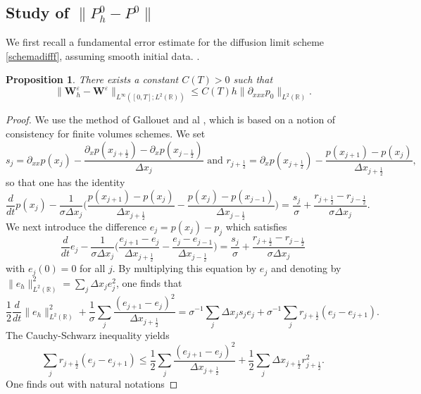 \documentclass[a4paper,french,english,10pt]{article}
\newcommand\eps{\varepsilon}
\newcommand\W{\mathbf{W}}
\newtheorem{proposition}[theorem]{Proposition}
\begin{document}
\subsection{Study of $\| P_h^0 - P^0  \|$}

We  first 
 recall a fundamental   error estimate \cite{FV}
for the diffusion limit scheme \eqref{schemadifff}, assuming smooth initial data.
. 
\begin{proposition}\label{ds1d}
There exists a constant $C(T)>0$ such that
\begin{equation*}
\|\W_h^\eps-\W^\eps\|_{L^{\infty}([0,T];L^2(\mathbb{R}))} \leq
C(T)h \| \partial_{xxx}p_0 \|_{L^2(\mathbb{R})  }.
\end{equation*}
\end{proposition}

\begin{proof}
We  use the method of Gallouet and al \cite{FV}, which
is based on  a notion of consistency for finite volumes schemes.
We set
$$
s_j=\partial_{xx}p(x_j)-\frac{\partial_xp(x_{j+\frac12}  )
-
\partial_xp(x_{j-\frac12}  )
}{\Delta x_j}
\mbox{ and }
r_{j+\frac12}=\partial_{x}p(x_{j+\frac12})-\frac{p(x_{j+1}  )
-
p(x_{j}  )
}{\Delta x_{j+\frac12}},
$$
so that one has the identity
$$
 \frac{d}{dt} p(x_j)
-\frac{1}{\sigma\Delta x_j}\bigg(\frac{p(x_{j+1})-p(x_{j})}{\Delta
x_{j+\frac12 }}-\frac{p(x_{j})-p(x_{j-1})}{\Delta
x_{j-\frac12 }}\bigg)=
\frac{s_j}\sigma+
\frac{r_{j+\frac12}-r_{j-\frac12}}{\sigma \Delta x_j}.
$$
We next  introduce the difference
$e_j=p(x_j)-p_j$ which satisfies
$$
 \frac{d}{dt} e_j
-\frac{1}{\sigma\Delta x_j}\bigg(\frac{e_{j+1}-e_{j}}{\Delta
x_{j+\frac12 }}-\frac{e_{j}-e_{j-1}}{\Delta
x_{j-\frac12 }}\bigg)=
\frac{s_j}\sigma+
\frac{r_{j+\frac12}-r_{j-\frac12}}{\sigma \Delta x_j}
$$
with $e_j(0)=0$ for all $j$.
By multiplying this equation by $e_j$
and  denoting by $\|e_h\|_{L^2(\mathbb{R})}^2= \sum_j \Delta x_je_j^2$,
one finds that 
\begin{equation*}\label{fgfg}
\frac12 \frac{d}{dt}\|e_h\|_{L^2(\mathbb{R})}^2 +\frac{1}{\sigma} \sum_j
\frac{(e_{j+1}-e_{j})^2}{\Delta
x_{j+\frac12 }}=
\sigma^{-1}\sum_j \Delta x_j s_j e_j+\sigma^{-1}\sum_jr_{j+\frac12 }(e_j-e_{j+1}).
\end{equation*}
The Cauchy-Schwarz inequality yields 
\begin{equation*}
\sum_jr_{j+\frac12 }(e_j-e_{j+1})\leq \frac{1}{2} \sum_j
\frac{(e_{j+1}-e_{j})^2}{\Delta x_{j+\frac12 }}+\frac{1}{2}\sum_j\Delta
x_{j+\frac12 }r_{j+\frac12 }^2.
\end{equation*}
One finds out with natural notations

\end{proof}
\end{document}
